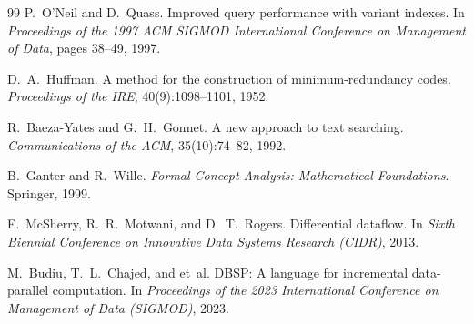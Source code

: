 \documentclass[10pt]{article}
\theoremstyle{definition}
\theoremstyle{remark}
\begin{document}
\begin{thebibliography}{99}
P.~O'Neil and D.~Quass.
\newblock Improved query performance with variant indexes.
\newblock In \emph{Proceedings of the 1997 ACM SIGMOD International Conference on Management of Data}, pages 38--49, 1997.

D.~A.~Huffman.
\newblock A method for the construction of minimum-redundancy codes.
\newblock \emph{Proceedings of the IRE}, 40(9):1098--1101, 1952.

R.~Baeza-Yates and G.~H.~Gonnet.
\newblock A new approach to text searching.
\newblock \emph{Communications of the ACM}, 35(10):74--82, 1992.

B.~Ganter and R.~Wille.
\newblock \emph{Formal Concept Analysis: Mathematical Foundations}.
\newblock Springer, 1999.

F.~McSherry, R.~R.~Motwani, and D.~T.~Rogers.
\newblock Differential dataflow.
\newblock In \emph{Sixth Biennial Conference on Innovative Data Systems Research (CIDR)}, 2013.

M.~Budiu, T.~L.~Chajed, and et~al.
\newblock DBSP: A language for incremental data-parallel computation.
\newblock In \emph{Proceedings of the 2023 International Conference on Management of Data (SIGMOD)}, 2023.

\end{thebibliography}
\end{document}
